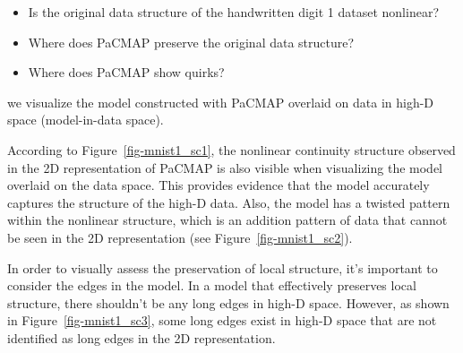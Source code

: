 \documentclass[
  12pt]{article}
\providecommand{\tightlist}{%
  \setlength{\itemsep}{0pt}\setlength{\parskip}{0pt}}\usepackage{longtable,booktabs,array}
\begin{document}
\begin{itemize}
\tightlist
\item
  Is the original data structure of the handwritten digit 1 dataset
  nonlinear?
\item
  Where does PaCMAP preserve the original data structure?
\item
  Where does PaCMAP show quirks?
\end{itemize}

we visualize the model constructed with PaCMAP overlaid on data in
high-D space (model-in-data space).

According to Figure~\ref{fig-mnist1_sc1}, the nonlinear continuity
structure observed in the 2D representation of PaCMAP is also visible
when visualizing the model overlaid on the data space. This provides
evidence that the model accurately captures the structure of the high-D
data. Also, the model has a twisted pattern within the nonlinear
structure, which is an addition pattern of data that cannot be seen in
the 2D representation (see Figure~\ref{fig-mnist1_sc2}).

In order to visually assess the preservation of local structure, it's
important to consider the edges in the model. In a model that
effectively preserves local structure, there shouldn't be any long edges
in high-D space. However, as shown in Figure~\ref{fig-mnist1_sc3}, some
long edges exist in high-D space that are not identified as long edges
in the 2D representation.
\end{document}
